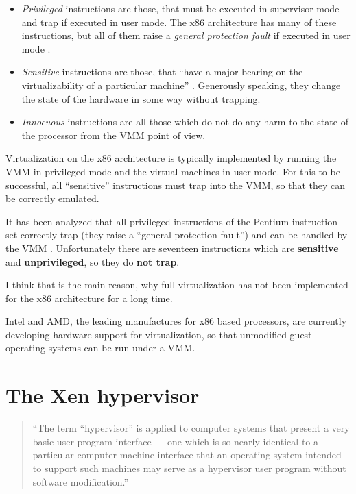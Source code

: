 \begin{itemize}
\item \emph{Privileged}  instructions are those, that must  be executed in
  supervisor mode and trap if  executed in user mode. The x86 architecture
  has many  of these instructions, but  all of them  raise a \emph{general
    protection fault} if executed in user mode \cite{robin00analysis}.
  
\item \emph{Sensitive} instructions are those, that ``have a major bearing
  on     the     virtualizability     of    a     particular     machine''
  \cite{popek74}.  Generously  speaking,  they  change the  state  of  the
  hardware in some way without trapping.
  
\item \emph{Innocuous} instructions are all those which do not do any harm
  to the state of the processor from the VMM point of view.
\end{itemize}

Virtualization on the x86 architecture is typically implemented by running
the VMM in privileged mode and the virtual machines in user mode. For this
to  be successful,  all ``sensitive''  instructions \cite{popek74,popek75}
must trap into the VMM, so that they can be correctly emulated.

It  has been  analyzed that  all  privileged instructions  of the  Pentium
instruction  set correctly  trap (\ie they  raise a  ``general protection
fault'')   and  can   be  handled   by  the   VMM  \cite{robin00analysis}.
Unfortunately    there    are    seventeen    instructions    which    are
\textbf{sensitive}  and  \textbf{unprivileged},  so  they  do  \textbf{not
  trap}.

I think  that is  the main  reason, why full  virtualization has  not been
implemented for the x86 architecture for a long time.

Intel  and AMD,  the leading  manufactures for  x86 based  processors, are
currently  developing   hardware  support  for   virtualization,  so  that
unmodified guest operating systems can be run under a VMM.

\section{The Xen hypervisor}
\label{sec:xen-hypervisor}

\begin{quote}
  ``The term “hypervisor” is applied to computer systems that present a very
basic user  program interface ---  one which is  so nearly identical  to a
particular computer machine interface that an operating system intended to
support  such machines  may serve  as  a hypervisor  user program  without
software modification.'' \cite{hendricks79}
\end{quote}

